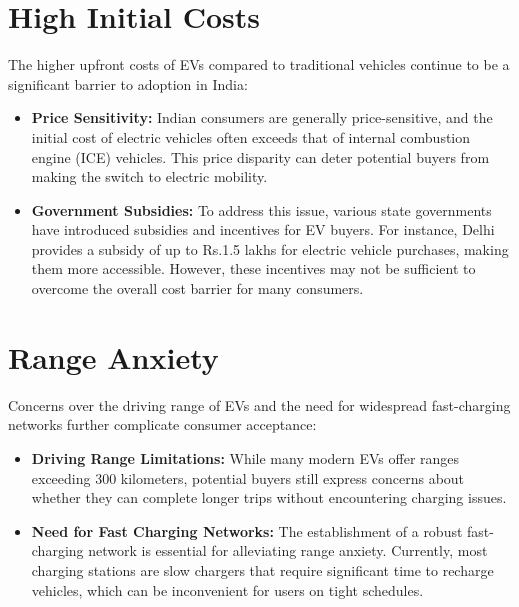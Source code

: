 \documentclass[a4paper,12pt]{report}
\begin{document}
\section{High Initial Costs}
The higher upfront costs of EVs compared to traditional vehicles continue to be a significant barrier to adoption in India:
\begin{itemize}
    \item \textbf{Price Sensitivity: }
    Indian consumers are generally price-sensitive, and the initial cost of electric vehicles often exceeds that of internal combustion engine (ICE) vehicles. This price disparity can deter potential buyers from making the switch to electric mobility.\cite{emobility+} \cite{decan}
    \item \textbf{Government Subsidies: }
    To address this issue, various state governments have introduced subsidies and incentives for EV buyers. For instance, Delhi provides a subsidy of up to Rs.1.5 lakhs for electric vehicle purchases, making them more accessible. However, these incentives may not be sufficient to overcome the overall cost barrier for many consumers.\cite{emobility+}
\end{itemize}

\section{Range Anxiety}
Concerns over the driving range of EVs and the need for widespread fast-charging networks further complicate consumer acceptance:
\begin{itemize}
    \item \textbf{Driving Range Limitations: }
    While many modern EVs offer ranges exceeding 300 kilometers, potential buyers still express concerns about whether they can complete longer trips without encountering charging issues. \cite{emobility+}\cite{codibly}
    \item \textbf{Need for Fast Charging Networks: }
    The establishment of a robust fast-charging network is essential for alleviating range anxiety. Currently, most charging stations are slow chargers that require significant time to recharge vehicles, which can be inconvenient for users on tight schedules.\cite{evPedia} \cite{codibly}
\end{itemize}
\end{document}
